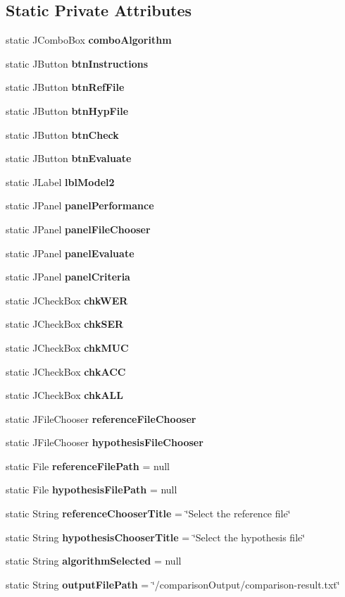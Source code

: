 \subsection*{Static Private Attributes}
\begin{DoxyCompactItemize}
\item 
static J\+Combo\+Box {\bf combo\+Algorithm}
\item 
static J\+Button {\bf btn\+Instructions}
\item 
static J\+Button {\bf btn\+Ref\+File}
\item 
static J\+Button {\bf btn\+Hyp\+File}
\item 
static J\+Button {\bf btn\+Check}
\item 
static J\+Button {\bf btn\+Evaluate}
\item 
static J\+Label {\bf lbl\+Model2}
\item 
static J\+Panel {\bf panel\+Performance}
\item 
static J\+Panel {\bf panel\+File\+Chooser}
\item 
static J\+Panel {\bf panel\+Evaluate}
\item 
static J\+Panel {\bf panel\+Criteria}
\item 
static J\+Check\+Box {\bf chk\+W\+E\+R}
\item 
static J\+Check\+Box {\bf chk\+S\+E\+R}
\item 
static J\+Check\+Box {\bf chk\+M\+U\+C}
\item 
static J\+Check\+Box {\bf chk\+A\+C\+C}
\item 
static J\+Check\+Box {\bf chk\+A\+L\+L}
\item 
static J\+File\+Chooser {\bf reference\+File\+Chooser}
\item 
static J\+File\+Chooser {\bf hypothesis\+File\+Chooser}
\item 
static File {\bf reference\+File\+Path} = null
\item 
static File {\bf hypothesis\+File\+Path} = null
\item 
static String {\bf reference\+Chooser\+Title} = \char`\"{}Select the reference file\char`\"{}
\item 
static String {\bf hypothesis\+Chooser\+Title} = \char`\"{}Select the hypothesis file\char`\"{}
\item 
static String {\bf algorithm\+Selected} = null
\item 
static String {\bf output\+File\+Path} = \char`\"{}/comparison\+Output/comparison-\/result.\+txt\char`\"{}
\item 

\end{DoxyCompactItemize}
